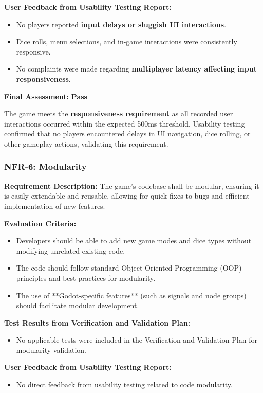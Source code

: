 \documentclass[12pt, titlepage]{article}
\begin{document}
\textbf{User Feedback from Usability Testing Report:}  
\begin{itemize}
    \item No players reported \textbf{input delays or sluggish UI interactions}.
    \item Dice rolls, menu selections, and in-game interactions were consistently responsive.
    \item No complaints were made regarding \textbf{multiplayer latency affecting input responsiveness}.
\end{itemize}

\textbf{Final Assessment:} \textbf{Pass}  

The game meets the \textbf{responsiveness requirement} as all recorded user interactions occurred within the expected 500ms threshold. Usability testing confirmed that no players encountered delays in UI navigation, dice rolling, or other gameplay actions, validating this requirement.


\subsubsection{NFR-6: Modularity}
\label{NFR6}

\textbf{Requirement Description:}  
The game’s codebase shall be modular, ensuring it is easily extendable and reusable, allowing for quick fixes to bugs and efficient implementation of new features.

\textbf{Evaluation Criteria:}  
\begin{itemize}
    \item Developers should be able to add new game modes and dice types without modifying unrelated existing code.
    \item The code should follow standard Object-Oriented Programming (OOP) principles and best practices for modularity.
    \item The use of **Godot-specific features** (such as signals and node groups) should facilitate modular development.
\end{itemize}

\textbf{Test Results from Verification and Validation Plan:}  
\begin{itemize}
    \item No applicable tests were included in the Verification and Validation Plan for modularity validation.
\end{itemize}

\textbf{User Feedback from Usability Testing Report:}  
\begin{itemize}
    \item No direct feedback from usability testing related to code modularity.
\end{itemize}
\end{document}
